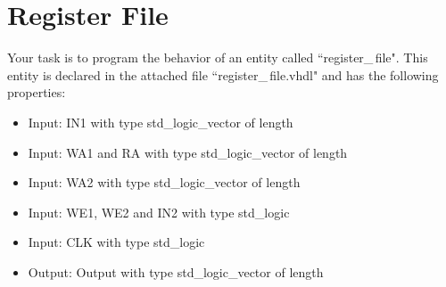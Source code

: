 \documentclass[a4paper,12pt]{article}
\begin{document}
\pagestyle{empty}
\setlength{\parindent}{0em} 
\section*{Register File}

Your task is to program the behavior of an entity called ``register\_\,file". This entity is declared in the attached file ``register\_\,file.vhdl" and has the following properties:
\begin{itemize}
\item Input:  IN1 with type std\_logic\_vector  of length %
\item Input:  WA1 and RA with type std\_logic\_vector of length %

\item Input:  WA2 with type std\_logic\_vector of length %


\item Input:  WE1, WE2 and IN2 with type std\_logic

\item Input:  CLK with type std\_logic


\item Output: Output with type std\_logic\_vector of length %
\end{itemize}
\end{document}

